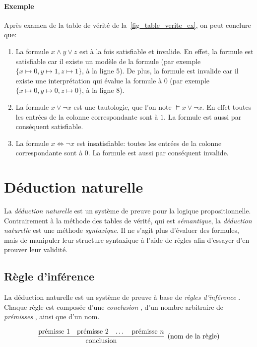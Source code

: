 \paragraph{Exemple} Après examen de la table de vérité de la~\cref{fig_table_verite_ex}, on peut conclure que:
\begin{enumerate}
\item
La formule $x \wedge y \vee z$ est à la fois satisfiable et invalide.
En effet, la formule est satisfiable car il existe un modèle de la formule (par exemple $\{ x \mapsto 0, y \mapsto 1, z \mapsto 1 \}$, à la ligne 5). 
De plus, la formule est invalide car il existe une interprétation qui évalue la formule à $0$ (par exemple $\{ x \mapsto 0, y \mapsto 0, z \mapsto 0 \}$, à la ligne 8).
\item
La formule $x \vee \neg x$ est une tautologie, que l'on note $\vDash x \vee \neg x$. En effet toutes les entrées de la colonne correspondante sont à $1$.
La formule est aussi par conséquent satisfiable.
\item
La formule $x \iff \neg x$ est insatisfiable: toutes les entrées de la colonne correspondante sont à $0$.
La formule est aussi par conséquent invalide.
\end{enumerate}

\section{Déduction naturelle}

La \og \textit{déduction naturelle} \fg{} est un système de preuve pour la logique propositionnelle.
Contrairement à la méthode des tables de vérité, qui est \textit{sémantique}, la \textit{déduction naturelle} est une méthode \textit{syntaxique}.
Il ne s'agit plus d'évaluer des formules, mais de manipuler leur structure syntaxique à l'aide de régles afin d'essayer d'en prouver leur validité.

\subsection{Règle d'inférence}

La déduction naturelle est un système de preuve à base de \og \textit{règles d'inférence} \fg.
Chaque règle est composée d'une \og \textit{conclusion} \fg{}, d'un nombre arbitraire de \og \textit{prémisses} \fg{}, ainsi que d'un nom.

\[
\infer[(\text{nom de la règle})]{\text{conclusion}}{\text{prémisse 1} & \text{prémisse 2} & \dots & \text{prémisse $n$}}
\]

